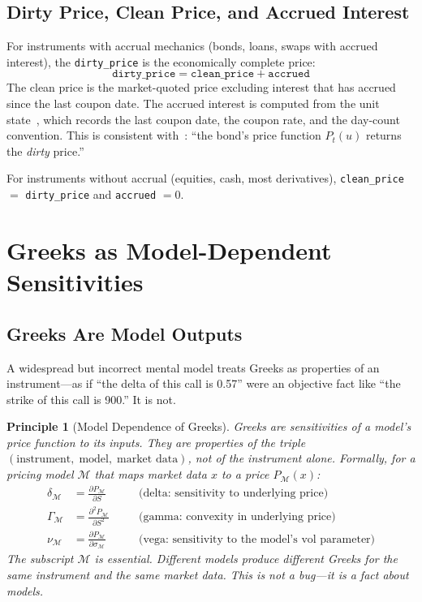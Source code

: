 \documentclass[11pt,a4paper]{article}
\newtheorem{principle}[definition]{Principle}
\begin{document}
\subsection{Dirty Price, Clean Price, and Accrued Interest}

For instruments with accrual mechanics (bonds, loans, swaps with accrued interest), the \texttt{dirty\_price} is the economically complete price:
\[
\texttt{dirty\_price} = \texttt{clean\_price} + \texttt{accrued}
\]
The clean price is the market-quoted price excluding interest that has accrued since the last coupon date.  The accrued interest is computed from the unit state~\cite[\S7]{ledger}, which records the last coupon date, the coupon rate, and the day-count convention.  This is consistent with~\cite[\S5.3]{ledger}: ``the bond's price function $P_t(u)$ returns the \emph{dirty} price.''

For instruments without accrual (equities, cash, most derivatives), \texttt{clean\_price} $=$ \texttt{dirty\_price} and \texttt{accrued} $= 0$.

\clearpage
\section{Greeks as Model-Dependent Sensitivities}
\label{sec:greeks}

\subsection{Greeks Are Model Outputs}

A widespread but incorrect mental model treats Greeks as properties of an instrument---as if ``the delta of this call is 0.57'' were an objective fact like ``the strike of this call is 900.''  It is not.

\begin{principle}[Model Dependence of Greeks]
\label{princ:greeks-model-dep}
Greeks are sensitivities of a \emph{model's price function} to its inputs.  They are properties of the triple $(\text{instrument},\; \text{model},\; \text{market data})$, not of the instrument alone.  Formally, for a pricing model $\mathcal{M}$ that maps market data $x$ to a price $P_\mathcal{M}(x)$:
\begin{align}
\delta_\mathcal{M} &= \frac{\partial P_\mathcal{M}}{\partial S} &\quad&\text{(delta: sensitivity to underlying price)} \\[4pt]
\Gamma_\mathcal{M} &= \frac{\partial^2 P_\mathcal{M}}{\partial S^2} &\quad&\text{(gamma: convexity in underlying price)} \\[4pt]
\nu_\mathcal{M} &= \frac{\partial P_\mathcal{M}}{\partial \sigma_\mathcal{M}} &\quad&\text{(vega: sensitivity to the model's vol parameter)}
\end{align}
The subscript $\mathcal{M}$ is essential.  Different models produce different Greeks for the same instrument and the same market data.  This is not a bug---it is a fact about models.
\end{principle}
\end{document}
